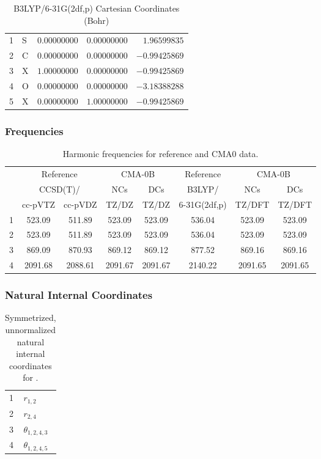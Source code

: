 \documentclass[10pt,oneside]{article}
\begin{document}
\begin{table}[h!]
\centering
\caption{B3LYP/6-31G(2df,p) Cartesian Coordinates (Bohr)}
\begin{tabular}{llrrr}
1  & S  & $ 0.00000000$ & $ 0.00000000$ & $ 1.96599835$ \\
2  & C  & $ 0.00000000$ & $ 0.00000000$ & $-0.99425869$ \\
3  & X  & $ 1.00000000$ & $ 0.00000000$ & $-0.99425869$ \\
4  & O  & $ 0.00000000$ & $ 0.00000000$ & $-3.18388288$ \\
5  & X  & $ 0.00000000$ & $ 1.00000000$ & $-0.99425869$ \\
\end{tabular}
\end{table}

\clearpage

\subsubsection*{Frequencies}
\begin{table}[h!]
\centering
\caption{Harmonic frequencies for reference and CMA0 data.}
\begin{tabular}{cccccccc}
\toprule
{} & \multicolumn{2}{c}{Reference} & \multicolumn{2}{c}{CMA-0B} &    Reference & \multicolumn{2}{c}{CMA-0B} \\
{} & \multicolumn{2}{c}{CCSD(T)/} &     NCs &     DCs &       B3LYP/ &     NCs &     DCs \\
{} &   cc-pVTZ & cc-pVDZ &   TZ/DZ &   TZ/DZ & 6-31G(2df,p) &  TZ/DFT &  TZ/DFT \\
\midrule
1 &    523.09 &  511.89 &  523.09 &  523.09 &       536.04 &  523.09 &  523.09 \\
2 &    523.09 &  511.89 &  523.09 &  523.09 &       536.04 &  523.09 &  523.09 \\
3 &    869.09 &  870.93 &  869.12 &  869.12 &       877.52 &  869.16 &  869.16 \\
4 &   2091.68 & 2088.61 & 2091.67 & 2091.67 &      2140.22 & 2091.65 & 2091.65 \\
\bottomrule
\end{tabular}
\end{table}

\clearpage

\subsubsection*{Natural Internal Coordinates}
\begin{table}[h!]
\centering
\caption{Symmetrized, unnormalized natural internal coordinates for .}
\small
\begin{tabular}{ll}
  1   & $r_{1,2}$ \\
  2   & $r_{2,4}$ \\
  3   & $\theta_{1,2,4,3}$ \\
  4   & $\theta_{1,2,4,5}$ \\
\end{tabular}
\end{table}
\end{document}
